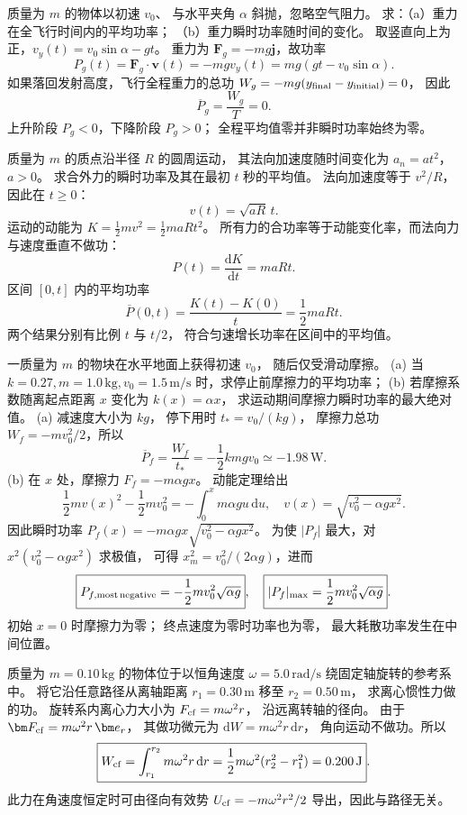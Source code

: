 质量为 $m$ 的物体以初速 $v_0$、
与水平夹角 $\alpha$ 斜抛，忽略空气阻力。
求：（a）重力在全飞行时间内的平均功率；
（b）重力瞬时功率随时间的变化。
\exsolution
取竖直向上为正，$v_y(t)=v_0\sin\alpha-gt$。
重力为 $\bm F_g=-mg\bm j$，故功率
\[
\boxed{P_g(t)=\bm F_g\cdot\bm v(t)
=-mgv_y(t)=mg(gt-v_0\sin\alpha)}.
\]
如果落回发射高度，飞行全程重力的总功
$W_g=-mg(y_{\rm final}-y_{\rm initial})=0$，
因此
\[
\boxed{\overline{P}_g=\frac{W_g}{T}=0}.
\]
\excheck 上升阶段 $P_g<0$，下降阶段 $P_g>0$；
全程平均值零并非瞬时功率始终为零。

质量为 $m$ 的质点沿半径 $R$ 的圆周运动，
其法向加速度随时间变化为 $a_n=at^2$，$a>0$。
求合外力的瞬时功率及其在最初 $t$ 秒的平均值。
\exsolution
法向加速度等于 $v^2/R$，因此在 $t\ge0$：
\[
v(t)=\sqrt{aR}\,t.
\]
运动的动能为
$K=\frac12mv^2=\frac12maRt^2$。
所有力的合功率等于动能变化率，而法向力与速度垂直不做功：
\[
\boxed{P(t)=\frac{\mathrm dK}{\mathrm dt}=maRt}.
\]
区间 $[0,t]$ 内的平均功率
\[
\boxed{\overline P(0,t)=\frac{K(t)-K(0)}t
=\frac12maRt}.
\]
\excheck 两个结果分别有比例 $t$ 与 $t/2$，
符合匀速增长功率在区间中的平均值。

一质量为 $m$ 的物块在水平地面上获得初速 $v_0$，
随后仅受滑动摩擦。
(a) 当 $k=0.27,m=1.0\,\mathrm{kg},v_0=1.5\,\mathrm{m/s}$
时，求停止前摩擦力的平均功率；
(b) 若摩擦系数随离起点距离 $x$ 变化为 $k(x)=\alpha x$，
求运动期间摩擦力瞬时功率的最大绝对值。
\exsolution
(a) 减速度大小为 $kg$，
停下用时 $t_*=v_0/(kg)$，
摩擦力总功 $W_f=-mv_0^2/2$，所以
\[
\boxed{\overline P_f=
\frac{W_f}{t_*}=-\frac12kmgv_0
\simeq-1.98\,\mathrm W}.
\]
(b) 在 $x$ 处，摩擦力 $F_f=-m\alpha gx$。
动能定理给出
\[
\frac12mv(x)^2-\frac12mv_0^2
=-\int_0^x m\alpha gu\,\mathrm du,
\quad
v(x)=\sqrt{v_0^2-\alpha gx^2}.
\]
因此瞬时功率
$P_f(x)=-m\alpha gx\sqrt{v_0^2-\alpha gx^2}$。
为使 $|P_f|$ 最大，对
$x^2(v_0^2-\alpha gx^2)$ 求极值，
可得 $x_m^2=v_0^2/(2\alpha g)$，进而
\[
\boxed{P_{f,\rm most\,negative}
=-\frac12m v_0^2\sqrt{\alpha g}},
\quad
\boxed{|P_f|_{\max}=\frac12m v_0^2\sqrt{\alpha g}}.
\]
\excheck 初始 $x=0$ 时摩擦力为零；
终点速度为零时功率也为零，
最大耗散功率发生在中间位置。

质量为 $m=0.10\,\mathrm{kg}$ 的物体位于以恒角速度
$\omega=5.0\,\mathrm{rad/s}$ 绕固定轴旋转的参考系中。
将它沿任意路径从离轴距离 $r_1=0.30\,\mathrm m$
移至 $r_2=0.50\,\mathrm m$，
求离心惯性力做的功。
\exsolution
旋转系内离心力大小为 $F_{\rm cf}=m\omega^2r$，
沿远离转轴的径向。
由于 $\bm F_{\rm cf}=m\omega^2r\,\bm e_r$，
其做功微元为
$\mathrm dW=m\omega^2r\,\mathrm dr$，
角向运动不做功。所以
\[
\boxed{W_{\rm cf}=\int_{r_1}^{r_2}
m\omega^2r\,\mathrm dr
=\frac12m\omega^2(r_2^2-r_1^2)
=0.200\,\mathrm J}.
\]
\excheck 此力在角速度恒定时可由径向有效势
$U_{\rm cf}=-m\omega^2r^2/2$ 导出，因此与路径无关。

